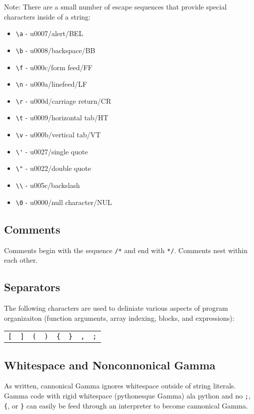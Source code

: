Note: There are a small number of escape sequences that provide special characters inside of a string:
\begin{itemize}
\item \verb!\a! - u0007/alert/BEL
\item \verb!\b! - u0008/backspace/BB
\item \verb!\f! - u000c/form feed/FF
\item \verb!\n! - u000a/linefeed/LF
\item \verb!\r! - u000d/carriage return/CR
\item \verb!\t! - u0009/horizontal tab/HT
\item \verb!\v! - u000b/vertical tab/VT
\item \verb!\'! - u0027/single quote
\item \verb!\"! - u0022/double quote
\item \verb!\\! - u005c/backslash
\item \verb!\0! - u0000/null character/NUL 
\end{itemize}

\subsection{Comments}
Comments begin with the sequence \verb!/*! and end with \verb!*/!. Comments nest within each other.

\subsection{Separators}
The following characters are used to deliniate various aspects of program organizaiton (function arguments, array indexing, blocks, and expressions):
\begin{center}
\begin{tabular}{cccccccc}
\verb![! & \verb|]| & \verb!(! & \verb!)! & \verb!{! & \verb!}! & \verb!,! & \verb!;!\\
\end{tabular}
\end{center}

\subsection{Whitespace and Nonconnonical Gamma}
As written, cannonical Gamma ignores whitespace outside of string literals. Gamma code with rigid whitespace (pythonesque Gamma) ala python and no \verb!;!, \verb!{!, or \verb!}! can easily be feed through an interpreter to become cannonical Gamma.